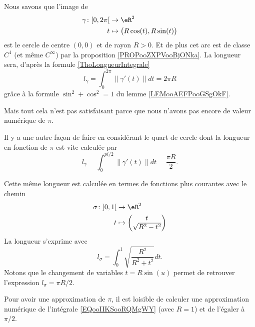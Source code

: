 \begin{example}
    Nous savons que l'image de 
    \begin{equation}
        \begin{aligned}
            \gamma\colon \mathopen[ 0 , 2\pi \mathclose[&\to \eR^2 \\
            t&\mapsto \big( R\cos(t),R\sin(t) \big) 
        \end{aligned}
    \end{equation}
    est le cercle de centre \( (0,0)\) et de rayon \( R>0\). Et de plus cet arc est de classe \( C^1\) (et même \(  C^{\infty}\)) par la proposition \ref{PROPooZXPVooBjONka}. La longueur sera, d'après la formule \eqref{ThoLongueurIntegrale}
    \begin{equation}
        l_{\gamma}=\int_0^{2\pi}\| \gamma'(t) \|dt=2\pi R
    \end{equation}
    grâce à la formule \( \sin^2+\cos^2=1\) du lemme \ref{LEMooAEFPooGSgOkF}.

    Mais tout cela n'est pas satisfaisant parce que nous n'avons pas encore de valeur numérique de \( \pi\).

    Il y a une autre façon de faire en considérant le quart de cercle dont la longueur en fonction de \( \pi\) est vite calculée par
    \begin{equation}
        l_{\gamma}=\int_0^{pi/2}\| \gamma'(t) \|dt=\frac{ \pi R }{ 2 }.
    \end{equation}

    Cette même longueur est calculée en termes de fonctions plus courantes avec le chemin
    \begin{equation}
        \begin{aligned}
        \sigma\colon \mathopen] 0 , 1 \mathclose[&\to \eR^2 \\
            t&\mapsto \begin{pmatrix}
                t    \\ 
                \sqrt{ R^2-t^2 }   
            \end{pmatrix}
        \end{aligned}
    \end{equation}
    La longueur s'exprime avec
    \begin{equation}        \label{EQooIIKSooRQMgWY}
        l_{\sigma}=\int_0^1\sqrt{ \frac{ R^2 }{ R^2+t^2 } }dt.
    \end{equation}
    Notons que le changement de variables \( t=R\sin(u)\) permet de retrouver l'expression \( l_{\sigma}=\pi R/2\).

    Pour avoir une approximation de \( \pi\), il est loisible de calculer une approximation numérique de l'intégrale \eqref{EQooIIKSooRQMgWY} (avec \( R=1\)) et de l'égaler à \( \pi/2\).
\end{example}

